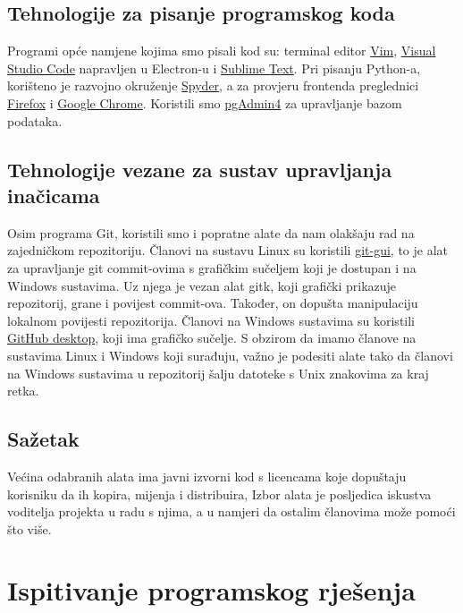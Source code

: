 			\subsection{Tehnologije za pisanje programskog koda}
				Programi opće namjene kojima smo pisali kod su: terminal editor \href{https://www.vim.org/}{Vim}, \href{https://code.visualstudio.com/}{Visual Studio Code} napravljen u Electron-u i \href{https://www.sublimetext.com/}{Sublime Text}. Pri pisanju Python-a, korišteno je razvojno okruženje \href{https://www.spyder-ide.org/}{Spyder}, a za provjeru frontenda preglednici \href{https://www.mozilla.org/en-US/firefox/new/}{Firefox} i \href{https://www.google.com/chrome/}{Google Chrome}. Koristili smo \href{https://www.pgadmin.org/download/}{pgAdmin4} za upravljanje bazom podataka.
				
			\subsection{Tehnologije vezane za sustav upravljanja inačicama}
				Osim programa Git, koristili smo i popratne alate da nam olakšaju rad na zajedničkom repozitoriju. Članovi na sustavu Linux su koristili \href{https://github.com/prati0100/git-gui/}{git-gui}, to je alat za upravljanje git commit-ovima s grafičkim sučeljem koji je dostupan i na Windows sustavima.	Uz njega je vezan alat gitk,	koji grafički prikazuje repozitorij, grane i povijest commit-ova. Također, on dopušta manipulaciju lokalnom povijesti repozitorija. Članovi na Windows sustavima su koristili \href{https://desktop.github.com/}{GitHub desktop}, koji ima grafičko sučelje. S obzirom da imamo članove na sustavima Linux i Windows koji surađuju, važno je podesiti alate tako da članovi na Windows sustavima u repozitorij šalju datoteke s Unix znakovima za kraj retka.
			\subsection{Sažetak}
				Većina odabranih alata ima javni izvorni kod s licencama koje dopuštaju korisniku da ih kopira, mijenja i distribuira, Izbor alata je posljedica iskustva voditelja projekta u radu s njima, a u namjeri da ostalim članovima može pomoći što više.
			\eject 
		
	
		\section{Ispitivanje programskog rješenja}
			
			
